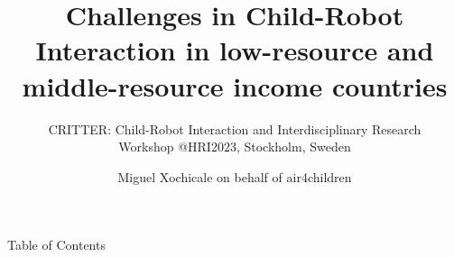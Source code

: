 \documentclass[xcolor={dvipsnames},aspectratio=169,10pt]{beamer}
\title{
Challenges in Child-Robot Interaction in low-resource and middle-resource income countries
}
\subtitle{
CRITTER: Child-Robot Interaction and Interdisciplinary Research \\
Workshop @HRI2023, Stockholm, Sweden
}
\author{
Miguel Xochicale on behalf of air4children
}
\date{
}
\institute{
	\faEnvelope \space  air4children@gmail.com \\
	\faGithubAlt \space @air4children \faTwitter \space @air4children  
		}
\begin{document}
\maketitle

\begin{frame}{Table of Contents}
    \tableofcontents
\end{frame}







\maketitle
\end{document}
